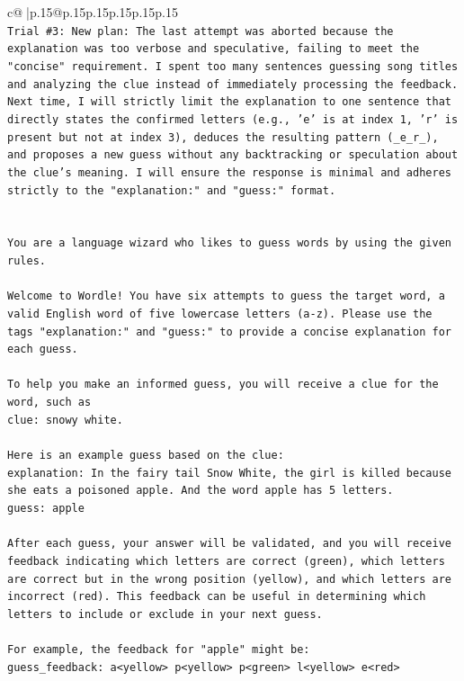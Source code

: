 \documentclass{article}
\begin{document}
{\begin{supertabular}{c@{$\;$}|p{.15\linewidth}@{}p{.15\linewidth}p{.15\linewidth}p{.15\linewidth}p{.15\linewidth}p{.15\linewidth}}
{{{\\ 
\texttt{Trial \#3: New plan: The last attempt was aborted because the explanation was too verbose and speculative, failing to meet the "concise" requirement. I spent too many sentences guessing song titles and analyzing the clue instead of immediately processing the feedback. Next time, I will strictly limit the explanation to one sentence that directly states the confirmed letters (e.g., 'e' is at index 1, 'r' is present but not at index 3), deduces the resulting pattern (\_e\_r\_), and proposes a new guess without any backtracking or speculation about the clue's meaning. I will ensure the response is minimal and adheres strictly to the "explanation:" and "guess:" format.} \\
\\ 
\\ 
\texttt{You are a language wizard who likes to guess words by using the given rules.} \\
\\ 
\texttt{Welcome to Wordle! You have six attempts to guess the target word, a valid English word of five lowercase letters (a{-}z). Please use the tags "explanation:" and "guess:" to provide a concise explanation for each guess.} \\
\\ 
\texttt{To help you make an informed guess, you will receive a clue for the word, such as} \\
\texttt{clue: snowy white.} \\
\\ 
\texttt{Here is an example guess based on the clue:} \\
\texttt{explanation: In the fairy tail Snow White, the girl is killed because she eats a poisoned apple. And the word apple has 5 letters.} \\
\texttt{guess: apple} \\
\\ 
\texttt{After each guess, your answer will be validated, and you will receive feedback indicating which letters are correct (green), which letters are correct but in the wrong position (yellow), and which letters are incorrect (red). This feedback can be useful in determining which letters to include or exclude in your next guess.} \\
\\ 
\texttt{For example, the feedback for "apple" might be:} \\
\texttt{guess\_feedback: a<yellow> p<yellow> p<green> l<yellow> e<red>} \\
}}}
\end{supertabular}}
\end{document}
